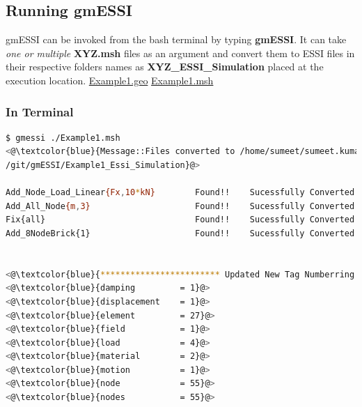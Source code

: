 \documentclass[11pt]{article}
\begin{document}
\subsection {Running gmESSI}

gmESSI  can  be invoked from the bash terminal by typing \textbf{gmESSI}. It
can take  \textit{one or multiple} \textbf{XYZ.msh} files as an argument and
convert them to ESSI files in their respective folders names as
\textbf{XYZ\_ESSI\_Simulation} placed at the execution location.
\href{http://beta.sumeetsinha.in/gmESSI/Examples/Example1/Example1.geo}{
Example1.geo}
\href{http://beta.sumeetsinha.in/gmESSI/Examples/Example1/Example1.msh}{
Example1.msh }


\subsubsection{In Terminal}

\begin{lstlisting}[language=bash,backgroundcolor=\color{grayish}]
$ gmessi ./Example1.msh
<@\textcolor{blue}{Message::Files converted to /home/sumeet/sumeet.kumar507@gmail.com \newline{}
/git/gmESSI/Example1_Essi_Simulation}@>  

Add_Node_Load_Linear{Fx,10*kN}        Found!!    Sucessfully Converted
Add_All_Node{m,3}                     Found!!    Sucessfully Converted
Fix{all}                              Found!!    Sucessfully Converted
Add_8NodeBrick{1}                     Found!!    Sucessfully Converted


<@\textcolor{blue}{************************ Updated New Tag Numberring *********************}@>
<@\textcolor{blue}{damping         = 1}@>
<@\textcolor{blue}{displacement    = 1}@>
<@\textcolor{blue}{element         = 27}@>
<@\textcolor{blue}{field           = 1}@>
<@\textcolor{blue}{load            = 4}@>
<@\textcolor{blue}{material        = 2}@>
<@\textcolor{blue}{motion          = 1}@>
<@\textcolor{blue}{node            = 55}@>
<@\textcolor{blue}{nodes           = 55}@>

\end{lstlisting}

\end{document}
